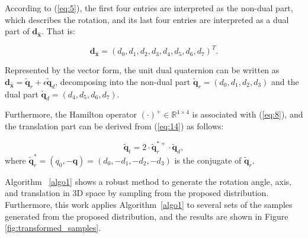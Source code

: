 \documentclass[micromachines,article,accept,pdftex,moreauthors]{Definitions/mdpi}
\begin{document}
According to (\ref{eq:5}), the first four entries are interpreted as the non-dual part, which describes the rotation, and its last four entries are interpreted as a dual part of $\boldsymbol{d}_{\boldsymbol{\widehat{x}}}$. That is:

\begin{equation} \label{eq:15}
    \boldsymbol{d}_{\boldsymbol{\widehat{x}}} =
    ({d_0},{d_1},{d_2},{d_3},{d_4},{d_5},{d_6},{d_7})^{T}.
\end{equation}

Represented by the vector form, the unit dual quaternion can be written as $\boldsymbol{d}_{\boldsymbol{\widehat{x}}} = \boldsymbol{\widetilde{q}}_{r} + \epsilon \boldsymbol{\widetilde{q}}_{d}$, decomposing into the non-dual part $\boldsymbol{\widetilde{q}}_{r} = ({d_0}, {d_1}, {d_2}, {d_3})$ and the dual part $\boldsymbol{\widetilde{q}}_{d} = ({d_4}, {d_5}, {d_6}, {d_7})$.

Furthermore, the Hamilton operator $(\cdot)^{+} \in \mathbb{R}^{4 \times 4}$ is associated with (\ref{eq:8}), and the translation part can be derived from (\ref{eq:14}) as follows: 

\begin{equation} \label{eq:16}
\boldsymbol{\widetilde{q}}_{t} = 2 \cdot 
{\widetilde{\boldsymbol{q}}_{r}^{*+}} \cdot \boldsymbol{\widetilde{q}}_d, 
\end{equation}
where $\widetilde{\boldsymbol{q}}_{r}^{*} = ({q_0}, -\boldsymbol{q}) = ({d_0}, -{d_1},-{d_2}, -{d_3})$ is the conjugate of $\widetilde{\boldsymbol{q}}_{r}$.


{Algorithm ~\ref{algo1}} shows a robust method to generate the rotation angle, axis, and translation in 3D space by sampling from the proposed distribution. Furthermore, this work applies {Algorithm~\ref{algo1}} to several sets of the samples generated from the proposed distribution, and the results are shown in Figure \ref{fig:transformed_samples}.
\vspace{6pt}%
\end{document}
